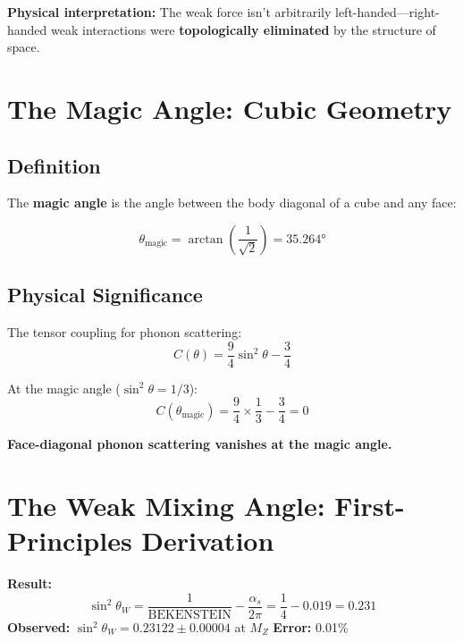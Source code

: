 \documentclass[12pt,a4paper]{article}
\newcommand{\sinW}{\sin^2\theta_W}
\newcommand{\BEKENSTEIN}{\text{BEKENSTEIN}}
\begin{document}
\textbf{Physical interpretation:} The weak force isn't arbitrarily left-handed---right-handed weak interactions were \textbf{topologically eliminated} by the structure of space.

\section{The Magic Angle: Cubic Geometry}
\label{sec:magic}

\subsection{Definition}

The \textbf{magic angle} is the angle between the body diagonal of a cube and any face:

\begin{equation}
\boxed{\theta_{\text{magic}} = \arctan\left(\frac{1}{\sqrt{2}}\right) = 35.264°}
\end{equation}

\subsection{Physical Significance}

The tensor coupling for phonon scattering:
\begin{equation}
C(\theta) = \frac{9}{4}\sin^2\theta - \frac{3}{4}
\end{equation}

At the magic angle ($\sin^2\theta = 1/3$):
\begin{equation}
C(\theta_{\text{magic}}) = \frac{9}{4} \times \frac{1}{3} - \frac{3}{4} = 0
\end{equation}

\textbf{Face-diagonal phonon scattering vanishes at the magic angle.}

\section{The Weak Mixing Angle: First-Principles Derivation}
\label{sec:weinberg}

\begin{derivedbox}
\textbf{Result:}
\begin{equation}
\sinW = \frac{1}{\BEKENSTEIN} - \frac{\alpha_s}{2\pi} = \frac{1}{4} - 0.019 = 0.231
\end{equation}
\textbf{Observed:} $\sinW = 0.23122 \pm 0.00004$ at $M_Z$ \quad \textbf{Error:} 0.01\%
\end{derivedbox}
\end{document}

